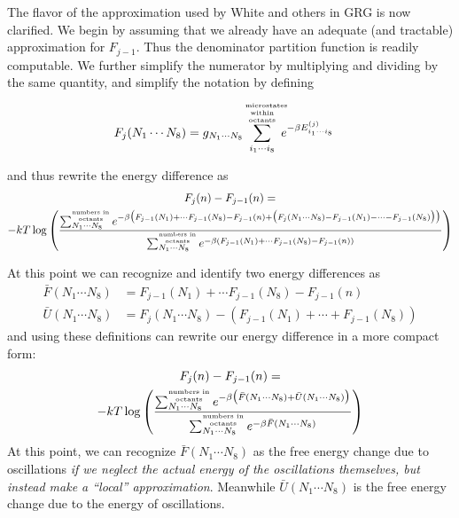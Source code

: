 \documentclass[letterpaper,twocolumn,amsmath,amssymb,pre,aps,10pt]{revtex4-1}
\begin{document}
The flavor of the approximation used by White and others in GRG is now
clarified.  We begin by assuming that we already have an adequate (and
tractable) approximation for $F_{j-1}$.  Thus the denominator
partition function is readily computable.  We further simplify the
numerator by multiplying and dividing by the same quantity, and
simplify the notation by defining
\begin{align}
  F_j(N_1\cdots N_8) &= g_{N_1\cdots N_8}
       \summicrostatesofoctants
       e^{-\beta E_{i_1\cdots i_8}^{(j)}}
\end{align}
\begin{widetext}
and thus rewrite the energy difference as
\begin{multline}
  F_j(n) - F_{j-1}(n) =\\
  -kT\log\left(\frac{
    \sumoccupanciesofoctants
       e^{-\beta \big(F_{j-1}(N_1) + \cdots F_{j-1}(N_8)  - F_{j-1}(n) +
           \big(F_j(N_1\cdots N_8) - F_{j-1}(N_1) - \cdots - F_{j-1}(N_8)\big) \big)}
  }{
    \sumoccupanciesofoctants
       e^{-\beta \left( F_{j-1}(N_1) + \cdots F_{j-1}(N_8)  - F_{j-1}(n) \right)}
  }
  \right)
\end{multline}
\end{widetext}
At this point we can recognize and identify two energy differences as
\begin{align}
  \bar{F}(N_1\cdots N_8) &= F_{j-1}(N_1) + \cdots F_{j-1}(N_8)  - F_{j-1}(n) \\
  \bar{U}(N_1\cdots N_8) &= F_j(N_1\cdots N_8)
  - \left(F_{j-1}(N_1) + \cdots + F_{j-1}(N_8) \right)
\end{align}
and using these definitions can rewrite our energy difference in a
more compact form:
\begin{multline}
  F_j(n) - F_{j-1}(n) =\\
  -kT\log\left(\frac{
    \sumoccupanciesofoctants
       e^{-\beta \big( \bar{F}(N_1\cdots N_8) + \bar{U}(N_1\cdots N_8)
         \big)}
  }{
    \sumoccupanciesofoctants
       e^{-\beta \bar{F}(N_1\cdots N_8)}
  }
  \right)
\end{multline}
At this point, we can recognize $\bar{F}(N_1\cdots N_8)$ as the free
energy change due to oscillations \emph{if we neglect the actual
  energy of the oscillations themselves, but instead make a ``local''
  approximation}.  Meanwhile $\bar{U}(N_1\cdots N_8)$ is the free
energy change due to the energy of oscillations.
\end{document}
